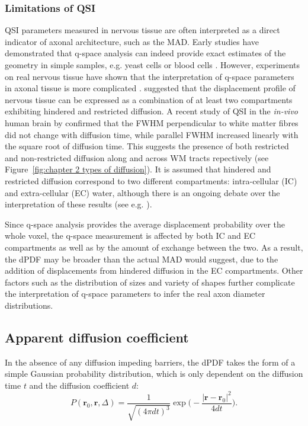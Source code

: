 \subsubsection{Limitations of QSI}
\Gls{QSI} parameters measured in nervous tissue are often interpreted as a direct indicator of axonal architecture, such as the \gls{MAD}.  Early studies have demonstrated that q-space analysis can indeed provide exact estimates of the geometry in simple samples, e.g. yeast cells \citep{Cory:1990} or blood cells \citep{Kuchel:1997}. However, experiments on real nervous tissue have shown that the interpretation of q-space parameters in axonal tissue is more complicated \citep{King:1994,Assaf:2000,Assaf:2000a,Bar-Shir:2008}. \citet{Assaf:2000} suggested that the displacement profile of nervous tissue can be expressed as a combination of at least two compartments exhibiting hindered and restricted diffusion. A recent study of QSI in the \emph{in-vivo} human brain by \citet{Nilsson:2009} confirmed that the FWHM perpendicular to white matter fibres did not change with diffusion time, while parallel FWHM increased linearly with the square root of diffusion time. This suggests the presence of both restricted and non-restricted diffusion along and across WM tracts repectively (see Figure~\ref{fig:chapter 2 types of diffusion}). It is assumed that hindered and restricted diffusion correspond to two different compartments: intra-cellular (IC) and extra-cellular (EC) water, although there is an ongoing debate over the interpretation of these results (see e.g. \citep{Kiselev:2007, Mulkern:2009}).


Since q-space analysis provides the average displacement probability over the whole voxel, the q-space measurement is affected by both IC and EC compartments as well as by the amount of exchange between the two. As a result, the \gls{dPDF} may be broader than the actual \gls{MAD} would suggest, due to the addition of displacements from hindered diffusion in the EC compartments. Other factors such as the distribution of sizes and variety of shapes further complicate the interpretation of q-space parameters to infer the real axon diameter distributions. 


\subsection{Apparent diffusion coefficient}
\label{subsec:adc}
In the absence of any diffusion impeding barriers, the \gls{dPDF} takes the form of a simple Gaussian probability distribution, which is only dependent on the diffusion time $t$ and the diffusion coefficient $d$:
\begin{equation}
P(\textbf{r}_{0},\textbf{r},\Delta) =  \frac{1}{\sqrt{(4\pi dt)^3}}\exp\bigg(-\frac{|\textbf{r}-\textbf{r}_{0}|^{2}}{4dt}\bigg).
\label{Gaussian PDF}
\end{equation}

